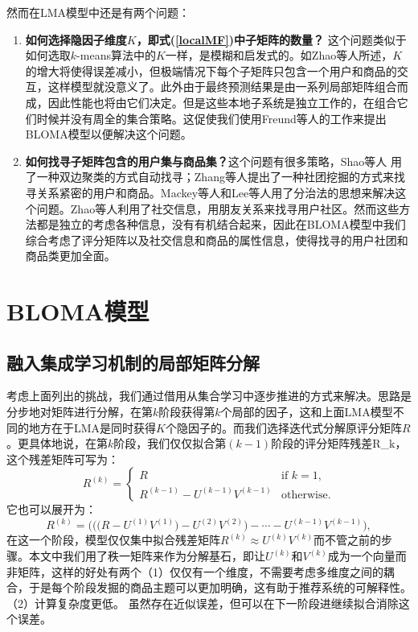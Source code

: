 然而在LMA模型中还是有两个问题：
\begin{enumerate}
\vspace{1.5mm}
\item \textbf{如何选择隐因子维度$K$，即式(\ref{localMF})中子矩阵的数量？} 这个问题类似于如何选取$k$-means算法中的$K$一样，是模糊和启发式的。如Zhao等人所述，$K$的增大将使得误差减小，但极端情况下每个子矩阵只包含一个用户和商品的交互，这样模型就没意义了。此外由于最终预测结果是由一系列局部矩阵组合而成，因此性能也将由它们决定。但是这些本地子系统是独立工作的，在组合它们时候并没有周全的集合策略。这促使我们使用Freund等人的工作来提出BLOMA模型以便解决这个问题。

\vspace{1.5mm}
\item \textbf{如何找寻子矩阵包含的用户集与商品集？}这个问题有很多策略，Shao等人 用了一种双边聚类的方式自动找寻；Zhang等人提出了一种社团挖掘的方式来找寻关系紧密的用户和商品。Mackey等人和Lee等人用了分治法的思想来解决这个问题。Zhao等人利用了社交信息，用朋友关系来找寻用户社区。然而这些方法都是独立的考虑各种信息，没有有机结合起来，因此在BLOMA模型中我们综合考虑了评分矩阵以及社交信息和商品的属性信息，使得找寻的用户社团和商品类更加全面。
\end{enumerate}


\section{BLOMA模型}
\label{main}

\subsection{融入集成学习机制的局部矩阵分解}
考虑上面列出的挑战，我们通过借用从集合学习中逐步推进的方式来解决。思路是分步地对矩阵进行分解，在第$k$阶段获得第$k$个局部的因子，这和上面LMA模型不同的地方在于LMA是同时获得$K$个隐因子的。而我们选择迭代式分解原评分矩阵$R$。更具体地说，在第$k$阶段，我们仅仅拟合第$(k-1)$阶段的评分矩阵残差\gls{R_k}，这个残差矩阵可写为：
\begin{equation}
\label{residue}
R^{(k)} = 
\begin{cases}
R& \text{if } k=1,\\
R^{(k-1)}-U^{(k-1)}V^{(k-1)}& \text{otherwise}.
\end{cases}
\end{equation}
它也可以展开为：
\begin{equation}
\label{unfold}
R^{(k)} = \bigg(\Big(\big(R-U^{(1)}V^{(1)}\big) - U^{(2)}V^{(2)} \Big)-\cdots-U^{(k-1)}V^{(k-1)}\bigg),
\end{equation}
在这一个阶段，模型仅仅集中拟合残差矩阵$R^{(k)} \approx U^{(k)}V^{(k)}$而不管之前的步骤。本文中我们用了秩一矩阵来作为分解基石，即让$U^{(k)}$和$V^{(k)}$成为一个向量而非矩阵，这样的好处有两个（1）仅仅有一个维度，不需要考虑多维度之间的耦合，于是每个阶段发掘的商品主题可以更加明确，这有助于推荐系统的可解释性。
（2）计算复杂度更低。 虽然存在近似误差，但可以在下一阶段进继续拟合消除这个误差。


